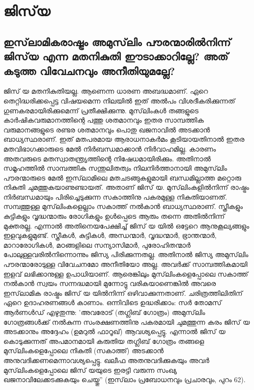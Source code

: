 \chapter{ജിസ്‌യ }
\section{ ഇസ്‌ലാമികരാഷ്ട്രം അമുസ്‌ലിം പൗരന്മാരില്‍നിന്ന് ജിസ്‌യ എന്ന മതനികുതി ഈടാക്കാറില്ലേ? അത് കടുത്ത വിവേചനവും അനീതിയുമല്ലേ?}


ജിസ് യ മതനികുതിയല്ല. ആണെന്ന ധാരണ അബദ്ധമാണ്. ഏറെ തെറ്റിദ്ധരിക്കപ്പെട്ട വിഷയമെന്ന നിലയില്‍ ഇത് അല്‍പം വിശദീകരിക്കുന്നത് ഗുണകരമായിരിക്കുമെന്ന് പ്രതീക്ഷിക്കുന്നു. മുസ്‌ലിംകള്‍ തങ്ങളുടെ കാര്‍ഷികവരുമാനത്തിന്റെ പത്തു ശതമാനവും ഇതര സാമ്പത്തിക വരുമാനങ്ങളുടെ രണ്ടര ശതമാനവും പൊതു ഖജനാവില്‍ അടക്കാന്‍ ബാധ്യസ്ഥരാണ്. ഇത് മതപരമായ ആരാധനാകര്‍മം കൂടിയായതിനാല്‍ ഇതര മതവിഭാഗക്കാരുടെ മേല്‍ നിര്‍ബന്ധമാക്കാന്‍ നിര്‍വാഹമില്ല. കാരണം അതവരുടെ മതസ്വാതന്ത്യ്രത്തിന്റെ നിഷേധമായിരിക്കും. അതിനാല്‍ സമൂഹത്തില്‍ സാമ്പത്തിക സന്തുലിതത്വം നിലനിര്‍ത്താനായി അമുസ്‌ലിം പൗരന്മാരുടെ മേല്‍ ഇസ്‌ലാമിലെ മതചടങ്ങുകളുമായി ബന്ധമില്ലാത്ത മറ്റൊരു നികുതി ചുമത്തുകയാണുണ്ടായത്. അതാണ് ജിസ് യ. മുസ്‌ലിംകളില്‍നിന്ന് രാഷ്ട്രം നിര്‍ബന്ധമായും പിരിച്ചെടുക്കുന്ന സകാത്തിനു പകരമുള്ള നികുതിയാണത്.
സമ്പത്തുള്ള മുസ്‌ലിംകളെല്ലാം സകാത്ത് നല്‍കാന്‍ ബാധ്യസ്ഥരാണ്. സ്ത്രീകളും കുട്ടികളും വൃദ്ധന്മാരും രോഗികളും ഉള്‍പ്പെടെ ആരും തന്നെ അതില്‍നിന്ന് മുക്തരല്ല. എന്നാല്‍ അതിനെയപേക്ഷിച്ച് ജിസ് യ യില്‍ ഒട്ടേറെ ആനുകൂല്യങ്ങളും ഇളവുകളുമുണ്ട്. സ്ത്രീകള്‍, കുട്ടികള്‍, അന്ധന്മാര്‍, വൃദ്ധന്മാര്‍, ഭ്രാന്തന്മാര്‍, മാറാരോഗികള്‍, മഠങ്ങളിലെ സന്യാസിമാര്‍, പുരോഹിതന്മാര്‍ പോലുള്ളവരില്‍നിന്നൊന്നും ജിസ്യ പിരിക്കുന്നതല്ല. അതിനാല്‍ ജിസ്യ അമുസ്‌ലിം പൗരന്മാരോടുള്ള വിവേചനമോ അനീതിയോ അല്ല. അവര്‍ക്ക് സാമ്പത്തികമായി ഇളവ് ലഭിക്കാനുള്ള ഉപാധിയാണ്.
ആരെങ്കിലും മുസ്‌ലിംകളെപ്പോലെ സകാത്ത് നല്‍കാന്‍ സ്വയം സന്നദ്ധമായി മുന്നോട്ടു വരികയാണെങ്കില്‍ അവരെ ഇസ്‌ലാമിക രാഷ്ട്രം ജിസ് യ യില്‍നിന്ന് ഒഴിവാക്കുന്നതാണ്. ചരിത്രത്തിലിതിന് ഏറെ ഉദാഹരണങ്ങള്‍ കാണാം. ഒന്നിവിടെ ഉദ്ധരിക്കാം: സര്‍ തോമസ് ആര്‍ണള്‍ഡ് എഴുതുന്നു: 'അവരോട് (തഗ്ലിബ് ഗോത്രം) അമുസ്‌ലിം ഗോത്രങ്ങള്‍ക്ക് നല്‍കുന്ന സംരക്ഷണത്തിനു പകരമായി ചുമത്തുന്ന കരം ജിസ് യ അടക്കാനും അദ്ദേഹം (ഉമറുല്‍ ഫാറൂഖ്) ആവശ്യപ്പെട്ടു. എന്നാല്‍ ജിസ് യ കൊടുക്കുന്നത് അപമാനമായി കരുതിയ തഗ്ലിബ് ഗോത്രം തങ്ങളെ മുസ്‌ലിംകളെപ്പോലെ നികുതി (സകാത്ത്) അടക്കാന്‍ അനുവദിക്കണമെന്നാവശ്യപ്പെട്ടു. ഖലീഫ അതനുവദിക്കുകയും അവര്‍ മുസ്‌ലിംകളെപ്പോലെ ജിസ് യയുടെ ഇരട്ടി വരുന്ന സംഖ്യ ഖജനാവിലേക്കടക്കുകയും ചെയ്തു'' (ഇസ്‌ലാം പ്രബോധനവും പ്രചാരവും, പുറം 62).
